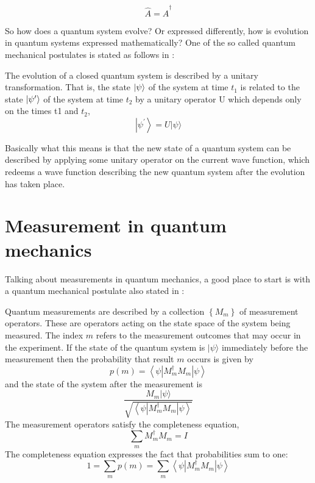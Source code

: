 \documentclass[../main.tex]{subfiles}
\begin{document}
\begin{equation*}
       \hat{A}=\hat{A}^\dagger
\end{equation*}

So how does a quantum system evolve? Or expressed differently, how is evolution in quantum systems expressed mathematically? One of the so called quantum mechanical postulates is stated as follows in \cite[ch.~2.2]{10.5555/1972505}:

\begin{displayquote}
The evolution of a closed quantum system is described by a unitary transformation. That is, the state $\ket{\psi}$ of the system at time $t_1$ is related to the state $\ket{\psi^\prime}$ of the system at time $t_2$ by a unitary operator U which depends only on the times t1 and $t_2$,
\begin{equation*}
\left|\psi^{\prime}\right\rangle=U|\psi\rangle
\end{equation*}
\end{displayquote}

Basically what this means is that the new state of a quantum system can be described by applying some unitary operator on the current wave function, which redeems a wave function describing the new quantum system after the evolution has taken place.

\section{Measurement in quantum mechanics}
Talking about measurements in quantum mechanics, a good place to start is with a quantum mechanical postulate also stated in \cite[ch.~2.2]{10.5555/1972505}:

\begin{displayquote}
Quantum measurements are described by a collection $\left\{M_{m}\right\}$ of measurement operators. These are operators acting on the state space of the system being measured. The index $m$ refers to the measurement outcomes that may occur in the experiment. If the state of the quantum system is $|\psi\rangle$ immediately before the measurement then the probability that result $m$ occurs is given by
$$
p(m)=\left\langle\psi\left|M_{m}^{\dagger} M_{m}\right| \psi\right\rangle
$$
and the state of the system after the measurement is
$$
\frac{M_{m}|\psi\rangle}{\sqrt{\left\langle\psi\left|M_{m}^{\dagger} M_{m}\right| \psi\right\rangle}}
$$
The measurement operators satisfy the completeness equation,
$$
\sum_{m} M_{m}^{\dagger} M_{m}=I
$$
The completeness equation expresses the fact that probabilities sum to one:
$$
1=\sum_{m} p(m)=\sum_{m}\left\langle\psi\left|M_{m}^{\dagger} M_{m}\right| \psi\right\rangle
$$
\end{displayquote}
\end{document}
